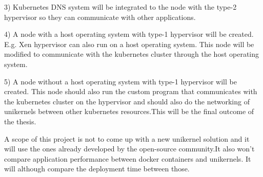 3) Kubernetes DNS system will be integrated to the node with the type-2 hypervisor so they can communicate with other applications.

4) A node with a host operating system with type-1 hypervisor will be created. E.g. Xen hypervisor can also run on a host operating system. This node will be modified to communicate with the kubernetes cluster through the host operating system. 

5) A node without a host operating system with type-1 hypervisor will be created. This node should also run the custom program that communicates with the kubernetes cluster on the hypervisor and should also do the networking of unikernels between other kubernetes resources.This will be the final outcome of the thesis.


A scope of this project is not to come up with a new unikernel solution and it will use the ones already developed by the open-source community.It also won't compare application performance between docker containers and unikernels. It will although compare the deployment time between those.
\fi